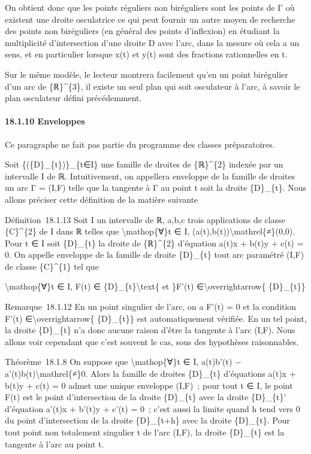 \documentclass[]{article}
\begin{document}
On obtient donc que les points réguliers non biréguliers sont les points
de Γ où existent une droite osculatrice ce qui peut fournir un autre
moyen de recherche des points non biréguliers (en général des points
d'inflexion) en étudiant la multiplicité d'intersection d'une droite D
avec l'arc, dans la mesure où cela a un sens, et en particulier lorsque
x(t) et y(t) sont des fractions rationnelles en t.

Sur le même modèle, le lecteur montrera facilement qu'en un point
birégulier d'un arc de \{ℝ\}\^{}\{3\}, il existe un seul plan qui soit
osculateur à l'arc, à savoir le plan osculateur défini précédemment.

\paragraph{18.1.10 Enveloppes}

Ce paragraphe ne fait pas partie du programme des classes préparatoires.

Soit \{(\{D\}\_\{t\})\}\_\{t∈I\} une famille de droites de
\{ℝ\}\^{}\{2\} indexée par un intervalle I de ℝ. Intuitivement, on
appellera enveloppe de la famille de droites un arc Γ = (I,F) telle que
la tangente à Γ au point t soit la droite \{D\}\_\{t\}. Nous allons
préciser cette définition de la matière suivante

Définition~18.1.13 Soit I un intervalle de ℝ, a,b,c trois applications
de classe \{C\}\^{}\{2\} de I dans ℝ telles que
\textbackslash{}mathop\{∀\}t ∈ I,
(a(t),b(t))\textbackslash{}mathrel\{≠\}(0,0). Pour t ∈ I soit
\{D\}\_\{t\} la droite de \{ℝ\}\^{}\{2\} d'équation a(t)x + b(t)y + c(t)
= 0. On appelle enveloppe de la famille de droite \{D\}\_\{t\} tout arc
paramétré (I,F) de classe \{C\}\^{}\{1\} tel que

\textbackslash{}mathop\{∀\}t ∈ I, F(t) ∈
\{D\}\_\{t\}\textbackslash{}text\{ et \}F'(t)
∈\textbackslash{}overrightarrow\{ \{D\}\_\{t\}\}

Remarque~18.1.12 En un point singulier de l'arc, on a F'(t) = 0 et la
condition F'(t) ∈\textbackslash{}overrightarrow\{ \{D\}\_\{t\}\} est
automatiquement vérifiée. En un tel point, la droite \{D\}\_\{t\} n'a
donc aucune raison d'être la tangente à l'arc (I,F). Nous allons voir
cependant que c'est souvent le cas, sous des hypothèses raisonnables.

Théorème~18.1.8 On suppose que \textbackslash{}mathop\{∀\}t ∈ I,
a(t)b'(t) − a'(t)b(t)\textbackslash{}mathrel\{≠\}0. Alors la famille de
droites \{D\}\_\{t\} d'équations a(t)x + b(t)y + c(t) = 0 admet une
unique enveloppe (I,F)~; pour tout t ∈ I, le point F(t) est le point
d'intersection de la droite \{D\}\_\{t\} avec la droite \{D\}\_\{t\}'
d'équation a'(t)x + b'(t)y + c'(t) = 0~; c'est aussi la limite quand h
tend vers 0 du point d'intersection de la droite \{D\}\_\{t+h\} avec la
droite \{D\}\_\{t\}. Pour tout point non totalement singulier t de l'arc
(I,F), la droite \{D\}\_\{t\} est la tangente à l'arc au point t.
\end{document}
